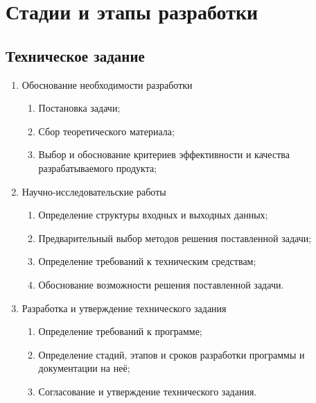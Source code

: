 \documentclass{../TechDoc}
\begin{document}
	\section{Стадии и этапы разработки}       
	\subsection{Техническое задание}
	\begin{enumerate}
		\item Обоснование необходимости разработки 
		\begin{enumerate}
			\item Постановка задачи;
			\item Сбор теоретического материала;
			\item Выбор и обоснование критериев эффективности и качества разрабатываемого продукта;
		\end{enumerate}
		
		
		\item Научно-исследовательские работы
		\begin{enumerate}
			\item Определение структуры входных и выходных данных;
			\item Предварительный выбор методов решения поставленной задачи;
			\item Определение требований к техническим средствам;
			\item Обоснование возможности решения поставленной задачи.
		\end{enumerate}
		
		\item Разработка и утверждение технического задания
		\begin{enumerate}
			\item Определение требований к программе;
			\item Определение стадий, этапов и сроков разработки программы и документации на неё;
			\item Согласование и утверждение технического задания.
		\end{enumerate}
		
	\end{enumerate}
	
\end{document}
